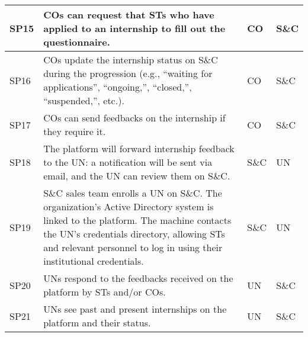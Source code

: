 \begin{longtable}{|l|p{}|l|l|}
    \hline
    SP15               & COs can request that STs who have applied to an internship to fill out the questionnaire.                                                                                                                                                             & CO                  & S\&C              \\
    \hline
    SP16               & COs update the internship status on S\&C during the progression (e.g., “waiting for applications”, “ongoing,”, “closed,”, “suspended,”, etc.).                                                                                                        & CO                  & S\&C              \\
    \hline
    SP17               & COs can send feedbacks on the internship if they require it.                                                                                                                                                                                          & CO                  & S\&C              \\
    \hline
    SP18               & The platform will forward internship feedback to the UN: a notification will be sent via email, and the UN can review them on S\&C.                                                                                                                   & S\&C                & UN                \\
    \hline
    SP19               & S\&C sales team enrolls a UN on S\&C. The organization's Active Directory system is linked to the platform. The machine contacts the UN's credentials directory, allowing STs and relevant personnel to log in using their institutional credentials. & S\&C                & UN                \\
    \hline
    SP20               & UNs respond to the feedbacks received on the platform by STs and/or COs.                                                                                                                                                                              & UN                  & S\&C              \\
    \hline
    SP21               & UNs see past and present internships on the platform and their status.                                                                                                                                                                                & UN                  & S\&C              \\
    \hline
\end{longtable}

